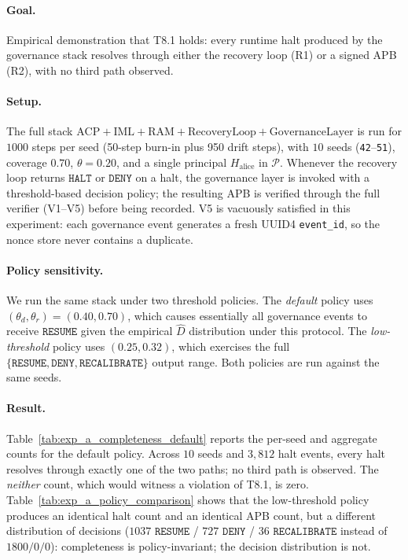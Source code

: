 \documentclass[11pt]{article}
\newcommand{\Dhat}{\widehat{D}}
\newcommand{\HALT}{\texttt{HALT}}
\newcommand{\RESUME}{\texttt{RESUME}}
\newcommand{\DENY}{\texttt{DENY}}
\newcommand{\RECAL}{\texttt{RECALIBRATE}}
\newcommand{\Pset}{\mathcal{P}}
\begin{document}
\paragraph{Goal.} Empirical demonstration that T8.1 holds: every
runtime halt produced by the governance stack resolves through either
the recovery loop (R1) or a signed APB (R2), with no third path
observed.

\paragraph{Setup.} The full stack
$\text{ACP} + \text{IML} + \text{RAM} + \text{RecoveryLoop} +
\text{GovernanceLayer}$ is run for $1000$ steps per seed (50-step
burn-in plus 950 drift steps), with $10$ seeds (\texttt{42}--\texttt{51}),
coverage $0.70$, $\theta = 0.20$, and a single principal
$H_{\mathrm{alice}}$ in $\Pset$. Whenever the recovery loop returns
$\HALT$ or $\DENY$ on a halt, the governance layer is invoked with a
threshold-based decision policy; the resulting APB is verified
through the full verifier (V1--V5) before being recorded.
V5 is vacuously satisfied in this experiment: each governance event
generates a fresh UUID4 \texttt{event\_id}, so the nonce store
never contains a duplicate.

\paragraph{Policy sensitivity.} We run the same stack under two
threshold policies. The \emph{default} policy uses
$(\theta_d, \theta_r) = (0.40, 0.70)$, which causes essentially all
governance events to receive $\RESUME$ given the empirical $\Dhat$
distribution under this protocol. The \emph{low-threshold} policy
uses $(0.25, 0.32)$, which exercises the full
$\{\RESUME, \DENY, \RECAL\}$ output range. Both policies are run
against the same seeds.

\paragraph{Result.} Table~\ref{tab:exp_a_completeness_default}
reports the per-seed and aggregate counts for the default policy.
Across $10$ seeds and $3{,}812$ halt events, every halt resolves through
exactly one of the two paths; no third path is observed. The
\emph{neither} count, which would witness a violation of T8.1, is
zero. Table~\ref{tab:exp_a_policy_comparison} shows that the
low-threshold policy produces an identical halt count and an identical
APB count, but a different distribution of decisions
($1037$ $\RESUME$ / $727$ $\DENY$ / $36$ $\RECAL$ instead of
$1800 / 0 / 0$): completeness is policy-invariant; the decision
distribution is not.
\end{document}
